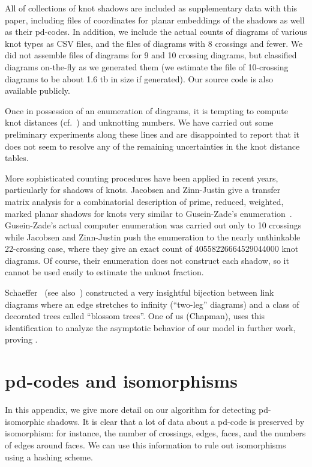 \documentclass[amsmath,secnumarabic,floatfix,amssymb,nofootinbib,nobibnotes,letterpaper,11pt,tightenlines,showkeys]{revtex4}
\theoremstyle{definition}
\newcommand{\pdcode}{pd-code }
\let\mgp=\marginpar \marginparwidth18mm \marginparsep1mm
\def\marginpar#1{\mgp{\raggedright\tiny #1}}
\let\lbl=\label
\def\label#1{\lbl{#1}\ifinner\else\marginpar{\ref{#1} #1}\ignorespaces\fi}
\begin{document}
All of collections of knot shadows are included as supplementary data with this paper, including files of coordinates for planar embeddings of the shadows as well as their pd-codes. In addition, we include the actual counts of diagrams of various knot types as CSV files, and the files of diagrams with 8 crossings and fewer. We did not assemble files of diagrams for 9 and 10 crossing diagrams, but classified diagrams on-the-fly as we generated them (we estimate the file of 10-crossing diagrams to be about 1.6 tb in size if generated). Our source code is also available publicly. 

Once in possession of an enumeration of diagrams, it is tempting to compute knot distances (cf.~\cite{DARCY:2001fi,MoonHyeyoung:2010tm}) and unknotting numbers. We have carried out some preliminary experiments along these lines and are disappointed to report that it does not seem to resolve any of the remaining uncertainties in the knot distance tables.

More sophisticated counting procedures have been applied in recent years, particularly for shadows of knots. Jacobsen and Zinn-Justin\cite{Jacobsen:2002kia} give a transfer matrix analysis for a combinatorial description of prime, reduced, weighted, marked planar shadows for knots very similar to Gusein-Zade's enumeration~\cite{GusenZade:1994wl,GusenZade:1998jz}. Gusein-Zade's actual computer enumeration was carried out only to 10 crossings while Jacobsen and Zinn-Justin push the enumeration to the nearly unthinkable 22-crossing case, where they give an exact count of 40558226664529044000 knot diagrams. Of course, their enumeration does not construct each shadow, so it cannot be used easily to estimate the unknot fraction.

Schaeffer~\cite{Schaeffer:1997wo} (see also~\cite{Bouttier:2002iu}) constructed a very insightful bijection between link diagrams where an edge stretches to infinity (``two-leg'' diagrams) and a class of decorated trees called ``blossom trees''. One of us (Chapman), uses this identification to analyze the asymptotic behavior of our model in further work, proving .

\appendix
\section{pd-codes and isomorphisms}
\label{app:pdcodes}

In this appendix, we give more detail on our algorithm for detecting pd-isomorphic shadows. It is clear that a lot of data about a \pdcode is preserved by isomorphism: for instance, the number of crossings, edges, faces, and the numbers of edges around faces. We can use this information to rule out isomorphisms using a hashing scheme.
\end{document}
